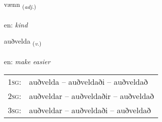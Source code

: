 \documentclass[frontgrid, backgrid]{flacards}\usepackage[]{graphicx}\usepackage[]{color}
\begin{document}
\renewcommand{\flhead}{\vskip5pt \fboxsep=0pt {\small\bfseries\footnotesize Lýsingarorð | Adjective}}
\renewcommand{\fcfoot}{\vskip5pt \fboxsep=0pt \hspace{2pt}{\small\bfseries\footnotesize 2K}}

\renewcommand{\blhead}{\vskip5pt {\small\bfseries\footnotesize Lýsingarorð | Adjective }}
\renewcommand{\bcfoot}{\vskip5pt \hspace{2pt}{\small\bfseries\footnotesize 2K}}


{vænn \small{\textsubscript{(\textit{adj.})}} \\[1ex] %
\textphonetic{[vaitn̥]} \\
en: \emph{kind} \\  [2ex]
\renewcommand*{\arraystretch}{0.8}
}

\renewcommand{\flhead}{\vskip5pt \fboxsep=0pt {\small\bfseries\footnotesize Sagnorð | Verb}}
\renewcommand{\fcfoot}{\vskip5pt \fboxsep=0pt \hspace{2pt}{\small\bfseries\footnotesize 2K}}

\renewcommand{\blhead}{\vskip5pt {\small\bfseries\footnotesize Sagnorð | Verb }}
\renewcommand{\bcfoot}{\vskip5pt \hspace{2pt}{\small\bfseries\footnotesize 2K}}


{auðvelda \small{\textsubscript{(\textit{v.})}} \\[1ex] %
\textphonetic{[œiðvɛlta]} \\
en: \emph{make easier} \\  [2ex]
\renewcommand*{\arraystretch}{0.8}
\begin{tabular}{p{1cm}l}
\textsc{1sg}: & auðvelda -- auðveldaði -- auðveldað \\ 
\textsc{2sg}: & auðveldar -- auðveldaðir -- auðveldað \\ 
\textsc{3sg}: & auðveldar -- auðveldaði -- auðveldað \\ 
\end{tabular}
}
\end{document}
